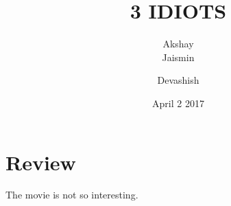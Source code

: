 \documentclass{article}
\title{3 IDIOTS}
\author{Akshay\\Jaismin}
\author{Devashish}
\date{April 2 2017}
\begin{document}
\maketitle
\section{Review}

The movie is not so interesting.
\end{document}
